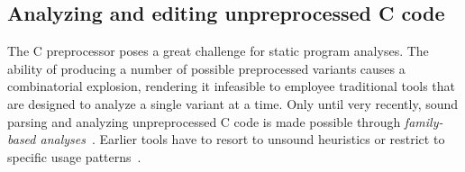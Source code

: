 





\subsection{Analyzing and editing unpreprocessed C code}
The C preprocessor poses a great challenge for static program
analyses. The ability of producing a number of possible preprocessed
variants causes a combinatorial explosion, rendering it infeasible to
employee traditional tools that are designed to analyze a single
variant at a time. Only until very recently, sound parsing and
analyzing unpreprocessed C code is made possible through
\emph{family-based
  analyses}~\cite{Kastner2011,Gazzillo2012,Liebig2013}. Earlier tools
have to resort to unsound heuristics or restrict to specific usage
patterns~\cite{Baxter2001,Garrido2005,Padioleau2009}.

